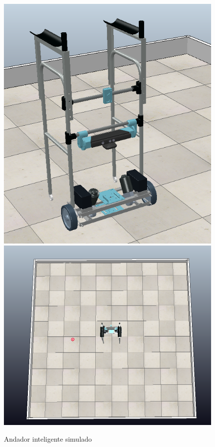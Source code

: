 \begin{figure}[H]
    \centering
    \includegraphics[scale=0.2]{figuras/robo_simulado_1.png}%
    \hspace{1cm}
    \includegraphics[scale=0.2]{figuras/visao_cima.png}
    \caption{Andador inteligente simulado}
\end{figure}

